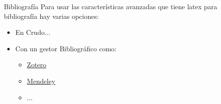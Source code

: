 \begin{frame}{Bibliografía}
   Para usar las características avanzadas que tiene latex para bibliografía hay varias opciones:
   \begin{itemize}
   \item En Crudo...
   \item Con un gestor Bibliográfico como:
   \begin{itemize}
   \item \href{https://www.zotero.org}{Zotero}
   \item \href{https://www.mendeley.com/}{Mendeley}
   \item ...
   \end{itemize}
   \end{itemize}
   \cite{vicario_ensenanza_2010}
    \end{frame}

